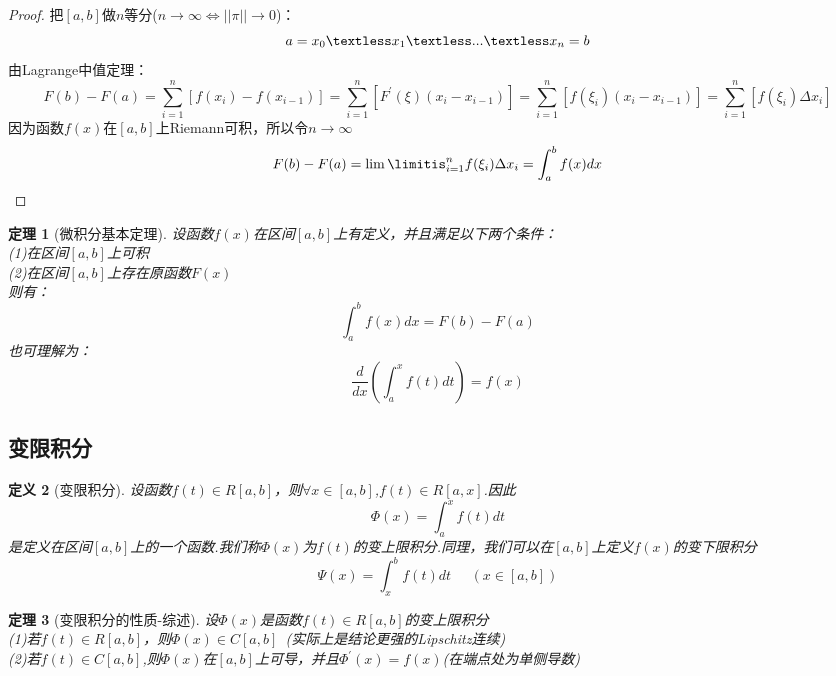 \documentclass[12pt, a4paper, oneside]{ctexart}
\newtheorem{theorem}{定理}[section]
\newtheorem{definition}[theorem]{定义}
\begin{document}
\begin{proof}
把$[a,b]$做$n$等分($n\to \infty \Leftrightarrow ||\pi||\to0$)：
\begin{equation*}
    a=x_0\textless x_1 \textless ... \textless x_n=b
\end{equation*}
由Lagrange中值定理：
\begin{equation*}
    F(b)-F(a)=\sum_{i=1}^n\left[f(x_i)-f(x_{i-1})  \right]=\sum_{i=1}^n\left[F^{\prime}(\xi)(x_i-x_{i-1})   \right]=\sum_{i=1}^n\left[f(\xi_i)(x_i-x_{i-1})   \right]=\sum_{i=1}^n\left[f(\xi_i)\Delta x_i   \right]
\end{equation*}
因为函数$f(x)$在$[a,b]$上Riemann可积，所以令$n\to\infty$
\begin{equation*}
    F(b)-F(a)=\lim\limitis_{i=1}^n f(\xi_i)\Delta x_i=\int_a^bf(x)dx
\end{equation*}
\end{proof}

\begin{theorem}[微积分基本定理]
设函数$f(x)$在区间$[a,b]$上有定义，并且满足以下两个条件：\\
(1)在区间$[a,b]$上可积\\
(2)在区间$[a,b]$上存在原函数$F(x)$\\
则有：
\begin{equation*}
    \int_a^bf(x)dx=F(b)-F(a)
\end{equation*}
也可理解为：
\begin{equation*}
    \frac{d}{dx}\left(\int_a^xf(t)dt\right)=f(x)
\end{equation*}
\end{theorem}


\subsection{变限积分}

\begin{definition}[变限积分]
设函数$f(t)\in R[a,b]$，则$\forall x \in[a,b]$,$f(t)\in R[a,x]$.因此
\begin{equation*}
    \Phi (x)=\int_a^xf(t)dt
\end{equation*}
是定义在区间$[a,b]$上的一个函数.我们称$\Phi(x)$为$f(t)$的变上限积分.同理，我们可以在$[a,b]$上定义$f(x)$的变下限积分
\begin{equation*}
    \Psi(x)=\int_x^bf(t)dt\;\;\;\;\;(x\in [a,b])
\end{equation*}
\end{definition}

\begin{theorem}[变限积分的性质-综述]
设$\Phi(x)$是函数$f(t)\in R[a,b]$的变上限积分\\
(1)若$f(t)\in R[a,b]$，则$\Phi(x)\in C[a,b]$\  (实际上是结论更强的Lipschitz连续) \\
(2)若$f(t)\in C[a,b]$,则$\Phi(x)$在$[a,b]$上可导，并且$\Phi^{\prime}(x)=f(x)$(在端点处为单侧导数)
\end{theorem}
\end{document}

